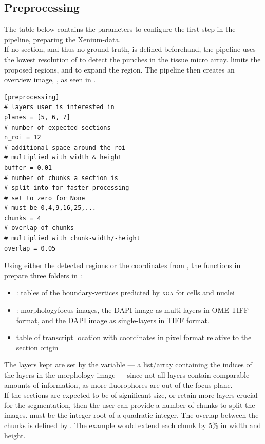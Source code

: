 \subsection*{Preprocessing}
The table below contains the parameters to configure the first step in the pipeline, preparing the Xenium-data.\\
If no section, and thus no ground-truth, is defined beforehand, the pipeline uses the lowest resolution of  to detect the punches in the tissue micro array.  limits the proposed regions, and  to expand the region. The pipeline then creates an overview image, , as seen in .\\
\begin{lstlisting}[style=customIni]
[preprocessing]
# layers user is interested in
planes = [5, 6, 7]
# number of expected sections
n_roi = 12
# additional space around the roi
# multiplied with width & height
buffer = 0.01
# number of chunks a section is 
# split into for faster processing
# set to zero for None
# must be 0,4,9,16,25,...
chunks = 4
# overlap of chunks
# multiplied with chunk-width/-height
overlap = 0.05
\end{lstlisting}
Using either the detected regions or the coordinates from , the functions in  prepare three folders in :
\begin{itemize}
    \item[] : tables of the boundary-vertices predicted by {\color{xenium}\textsc{xoa}} for cells and nuclei
    \item[] : morphology\us focus images, the DAPI image as multi-layers in OME-TIFF format, and the DAPI image as single-layers in TIFF format.
    \item[]  table of transcript location with coordinates in pixel format relative to the section origin
\end{itemize}
The layers kept are set by the  variable --- a list/array containing the indices of the layers in the morphology image --- since not all layers contain comparable amounts of information, as more fluorophores are out of the focus-plane.\\
If the sections are expected to be of significant size, or retain more layers crucial for the segmentation, then the user can provide a number of chunks to split the images.  must be the integer-root of a quadratic integer. The overlap between the chunks is defined by . The example would extend each chunk by 5\% in width and height.\\
